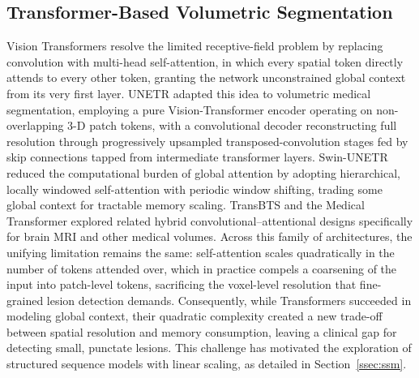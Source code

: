 \documentclass[pdflatex,sn-mathphys-num]{sn-jnl}
\begin{document}
\subsection{Transformer-Based Volumetric Segmentation}\label{ssec:vit}
Vision Transformers \citep{dosovitskiy2020image} resolve the limited
receptive-field problem by replacing convolution with multi-head
self-attention, in which every spatial token directly attends to
every other token, granting the network unconstrained global context
from its very first layer. UNETR \citep{hatamizadeh2022unetr} adapted
this idea to volumetric medical segmentation, employing a pure
Vision-Transformer encoder operating on non-overlapping 3-D patch
tokens, with a convolutional decoder reconstructing full
resolution through progressively upsampled transposed-convolution
stages fed by skip connections tapped from intermediate transformer
layers. Swin-UNETR \citep{tang2022self} reduced the computational
burden of global attention by adopting hierarchical, locally windowed
self-attention with periodic window shifting, trading some global
context for tractable memory scaling. TransBTS \citep{wang2021transbts}
and the Medical Transformer \citep{valanarasu2021medical} explored
related hybrid convolutional--attentional designs specifically for
brain MRI and other medical volumes. Across this family of
architectures, the unifying limitation remains the same: self-attention
scales quadratically in the number of tokens attended over, which in
practice compels a coarsening of the input into patch-level tokens,
sacrificing the voxel-level resolution that fine-grained lesion
detection demands. Consequently, while Transformers succeeded in modeling global context, their quadratic complexity created a new trade-off between spatial resolution and memory consumption, leaving a clinical gap for detecting small, punctate lesions. This challenge has motivated the exploration of structured sequence models with linear scaling, as detailed in Section~\ref{ssec:ssm}.
\end{document}

